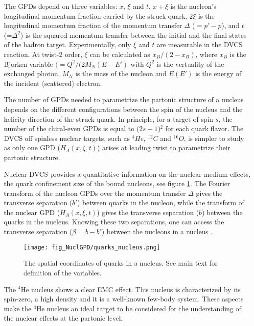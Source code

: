 The GPDs depend on three variables: $x$, $\xi$ and $t$. $x+\xi$ is the 
nucleon's longitudinal momentum fraction carried by the struck quark, 2$\xi$ is 
the longitudinal momentum fraction of the momentum transfer $\Delta$ ($= p' - 
p$), and $t$ (=$\Delta^{2}$) is the squared momentum transfer between the 
initial and the final states of the hadron target. Experimentally, only $\xi$ 
and $t$ are measurable in the DVCS reaction. At twist-2 order, $\xi$ can be 
calculated as $x_B/(2-x_B)$, where $x_B$ is the Bjorken variable $(= 
Q^{2}/(2M_{N}(E-E')$ with $Q^2$ is the vertuality of the exchanged photon, 
$M_{N}$ is the mass of the nucleon and $E(E')$ is the energy of the incident 
(scattered) electron.

The number of GPDs needed to parametrize the partonic structure of a nucleus 
depends on the different configurations between the spin of the nucleus and the 
helicity direction of the struck quark.  In principle, for a target of spin 
$s$, the number of the chiral-even GPDs is equal to ($2s+1$)$^2$ for each quark 
flavor. The DVCS off spinless nuclear targets, such as $^4He$, $^{12}C$ and 
$^{16}O$, is simpler to study as only one GPD ($H_{A}(x,\xi,t)$) arises at 
leading twist to parametrize their partonic structure.

Nuclear DVCS provides a quantitative information on the nuclear medium effects, 
the quark confinement size of the bound nucleons, see figure 
\ref{fig:quarks_nucleus}. The Fourier transform of the nucleon GPDs over the 
momentum transfer $\Delta$ gives the transverse separation ($b'$) between 
quarks in the nucleon, while the transform of the nuclear GPD 
($H_{A}(x,\xi,t)$) gives the transverse separation ($b$) between the quarks in 
the nucleus. Knowing these two separations, one can access the transverse 
separation ($\beta = b - b'$) between the nucleons in a nucleus 
\cite{Liuti:2005qj}.

\begin{figure}[tbp]
\centering
\texttt{[image: fig\_NuclGPD/quarks\_nucleus.png]}
\vspace{-0.7in}
\caption{The spatial coordinates of quarks in a nucleus. See main text for 
definition of the variables.}
\label{fig:quarks_nucleus}
\end{figure}

The $^4$He nucleus shows a clear EMC effect. This nucleus is characterized by 
its spin-zero, a high density and it is a well-known few-body system. These 
aspects make the $^4$He nucleus an ideal target to be considered for the 
understanding of the nuclear effects at the partonic level. 
  
